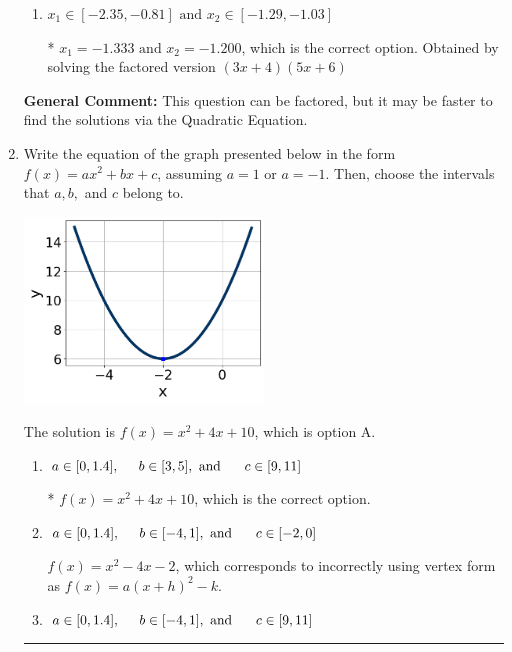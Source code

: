 \documentclass{extbook}[14pt]
\newcommand{\litem}[1]{\item #1

\rule{\textwidth}{0.4pt}}
\begin{document}
\begin{enumerate}
{\begin{enumerate}[label=\Alph*.]
$x_1 = -6.000 \text{ and } x_2 = -0.267$, which corresponds to solving the factored version $(x + 6)(15x + 4)$
\item \( x_1 \in [-2.35, -0.81] \text{ and } x_2 \in [-1.29, -1.03] \)

* $x_1 = -1.333 \text{ and } x_2 = -1.200$, which is the correct option. Obtained by solving the factored version $(3x + 4)(5x + 6)$
\end{enumerate}

\textbf{General Comment:} This question can be factored, but it may be faster to find the solutions via the Quadratic Equation.
}
\litem{
Write the equation of the graph presented below in the form $f(x)=ax^2+bx+c$, assuming  $a=1$ or $a=-1$. Then, choose the intervals that $a, b,$ and $c$ belong to.

\begin{center}
    \includegraphics[width=0.5\textwidth]{../Figures/quadraticGraphToEquationCopyA.png}
\end{center}


The solution is \( f(x) = x^{2} +4 x + 10 \), which is option A.\begin{enumerate}[label=\Alph*.]
\item \( a \in [0, 1.4], \hspace*{5mm} b \in [3, 5], \text{ and } \hspace*{5mm} c \in [9, 11] \)

* $f(x)=x^{2} +4 x + 10$, which is the correct option.
\item \( a \in [0, 1.4], \hspace*{5mm} b \in [-4, 1], \text{ and } \hspace*{5mm} c \in [-2, 0] \)

$f(x)=x^{2} -4 x -2$, which corresponds to incorrectly using vertex form as $f(x) = a(x+h)^2 - k$.
\item \( a \in [0, 1.4], \hspace*{5mm} b \in [-4, 1], \text{ and } \hspace*{5mm} c \in [9, 11] \)


\end{enumerate}}
\end{enumerate}
\end{document}
